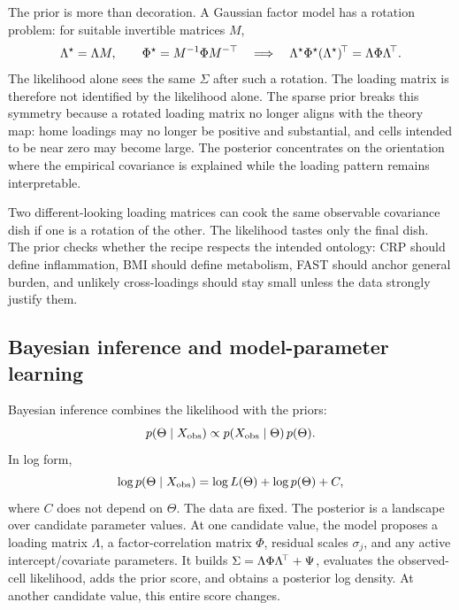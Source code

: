 The prior is more than decoration. A Gaussian factor model has a rotation problem: for suitable invertible
matrices $M$,
\begin{equation}
\label{eq:rotation}
\Lambda^\star=\Lambda M,
\qquad
\Phi^\star=M^{-1}\Phi M^{-\top}
\quad\Longrightarrow\quad
\Lambda^\star\Phi^\star(\Lambda^\star)^{\!\top}=\Lambda\Phi\Lambda^{\!\top}.
\end{equation}
The likelihood alone sees the same $\Sigma$ after such a rotation. The loading matrix is therefore not
identified by the likelihood alone. The sparse prior breaks this symmetry because a rotated loading matrix no
longer aligns with the theory map: home loadings may no longer be positive and substantial, and cells intended
to be near zero may become large. The posterior concentrates on the orientation where the empirical covariance
is explained while the loading pattern remains interpretable.

\begin{methodsbox}
Two different-looking loading matrices can cook the same observable covariance dish if one is a rotation of the
other. The likelihood tastes only the final dish. The prior checks whether the recipe respects the intended
ontology: CRP should define inflammation, BMI should define metabolism, FAST should anchor general burden, and
unlikely cross-loadings should stay small unless the data strongly justify them.
\end{methodsbox}

\subsection{Bayesian inference and model-parameter learning}
\label{sub:posterior}
Bayesian inference combines the likelihood with the priors:
\begin{equation}
\label{eq:skeleton}
p(\Theta\mid X_{\mathrm{obs}})
\propto
p(X_{\mathrm{obs}}\mid\Theta)\,p(\Theta).
\end{equation}
In log form,
\begin{equation}
\log p(\Theta\mid X_{\mathrm{obs}})
=
\log L(\Theta)+\log p(\Theta)+C,
\end{equation}
where $C$ does not depend on $\Theta$. The data are fixed. The posterior is a landscape over candidate parameter
values. At one candidate value, the model proposes a loading matrix $\Lambda$, a factor-correlation matrix
$\Phi$, residual scales $\sigma_j$, and any active intercept/covariate parameters. It builds
$\Sigma=\Lambda\Phi\Lambda^{\!\top}+\Psi$, evaluates the observed-cell likelihood, adds the prior score, and obtains a
posterior log density. At another candidate value, this entire score changes.

